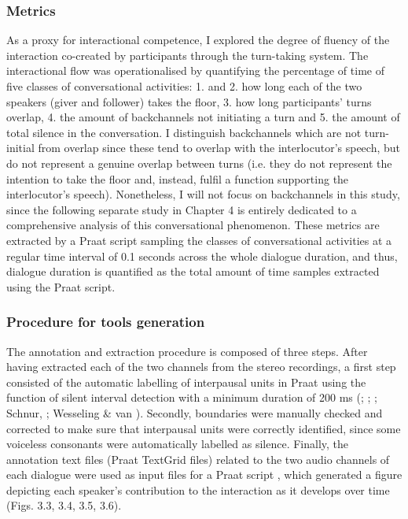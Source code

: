 \subsubsection{Metrics}
\hypertarget{Toc191305932}{}
As a proxy for interactional competence, I explored the degree of fluency of the interaction co-created by participants through the turn-taking system. The interactional flow was operationalised by quantifying the percentage of time of five classes of conversational activities: 1. and 2. how long each of the two speakers (giver and follower) takes the floor, 3. how long participants’ turns overlap, 4. the amount of backchannels not initiating a turn and 5. the amount of total silence in the conversation. I distinguish backchannels which are not turn-initial from overlap since these tend to overlap with the interlocutor’s speech, but do not represent a genuine overlap between turns (i.e. they do not represent the intention to take the floor and, instead, fulfil a function supporting the interlocutor’s speech). Nonetheless, I will not focus on backchannels in this study, since the following separate study in Chapter 4 is entirely dedicated to a comprehensive analysis of this conversational phenomenon. These metrics are extracted by a Praat script sampling the classes of conversational activities at a regular time interval of 0.1 seconds across the whole dialogue duration, and thus, dialogue duration is quantified as the total amount of time samples extracted using the Praat script.

\subsubsection{Procedure for tools generation}
\hypertarget{Toc191305933}{}
The annotation and extraction procedure is composed of three steps. After having extracted each of the two channels from the stereo recordings, a first step consisted of the automatic labelling of interpausal units in Praat using the function of silent interval detection with a minimum duration of 200 ms (\citealt{GleitmanEtAl2007}; \citealt{GriffinBock2000}; \citealt{LevinsonTorreira2015}; Schnur, \citealt{CostaCaramazza2006}; Wesseling \& van \citealt{Son2005}). Secondly, boundaries were manually checked and corrected to make sure that interpausal units were correctly identified, since some voiceless consonants were automatically labelled as silence. Finally, the annotation text files (Praat TextGrid files) related to the two audio channels of each dialogue were used as input files for a Praat script \citep{CangemiEtAl2023}, which generated a figure depicting each speaker’s contribution to the interaction as it develops over time (Figs. 3.3, 3.4, 3.5, 3.6).

